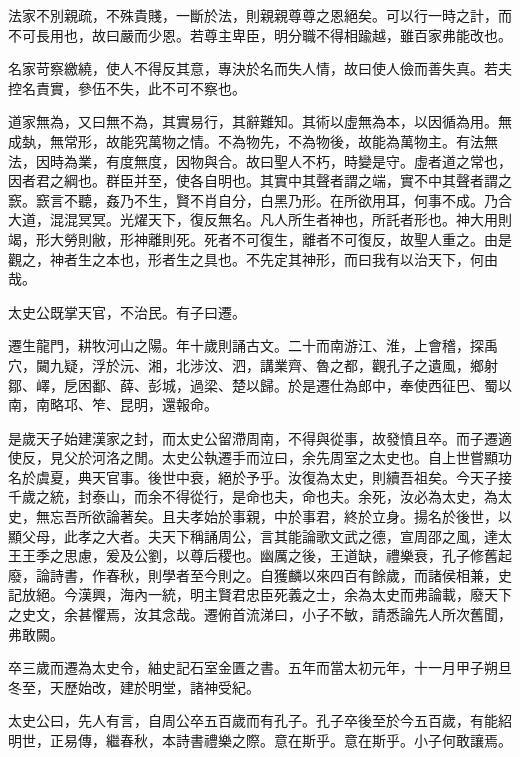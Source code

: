 法家不別親疏，不殊貴賤，一斷於法，則親親尊尊之恩絕矣。可以行一時之計，而不可長用也，故曰嚴而少恩。若尊主卑臣，明分職不得相踰越，雖百家弗能改也。

名家苛察繳繞，使人不得反其意，專決於名而失人情，故曰使人儉而善失真。若夫控名責實，參伍不失，此不可不察也。

道家無為，又曰無不為，其實易行，其辭難知。其術以虛無為本，以因循為用。無成埶，無常形，故能究萬物之情。不為物先，不為物後，故能為萬物主。有法無法，因時為業，有度無度，因物與合。故曰聖人不朽，時變是守。虛者道之常也，因者君之綱也。群臣并至，使各自明也。其實中其聲者謂之端，實不中其聲者謂之窾。窾言不聽，姦乃不生，賢不肖自分，白黑乃形。在所欲用耳，何事不成。乃合大道，混混冥冥。光燿天下，復反無名。凡人所生者神也，所託者形也。神大用則竭，形大勞則敝，形神離則死。死者不可復生，離者不可復反，故聖人重之。由是觀之，神者生之本也，形者生之具也。不先定其神形，而曰我有以治天下，何由哉。

太史公既掌天官，不治民。有子曰遷。

遷生龍門，耕牧河山之陽。年十歲則誦古文。二十而南游江、淮，上會稽，探禹穴，闚九疑，浮於沅、湘，北涉汶、泗，講業齊、魯之都，觀孔子之遺風，鄉射鄒、嶧，戹困鄱、薛、彭城，過梁、楚以歸。於是遷仕為郎中，奉使西征巴、蜀以南，南略邛、笮、昆明，還報命。

是歲天子始建漢家之封，而太史公留滯周南，不得與從事，故發憤且卒。而子遷適使反，見父於河洛之閒。太史公執遷手而泣曰，余先周室之太史也。自上世嘗顯功名於虞夏，典天官事。後世中衰，絕於予乎。汝復為太史，則續吾祖矣。今天子接千歲之統，封泰山，而余不得從行，是命也夫，命也夫。余死，汝必為太史，為太史，無忘吾所欲論著矣。且夫孝始於事親，中於事君，終於立身。揚名於後世，以顯父母，此孝之大者。夫天下稱誦周公，言其能論歌文武之德，宣周邵之風，達太王王季之思慮，爰及公劉，以尊后稷也。幽厲之後，王道缺，禮樂衰，孔子修舊起廢，論詩書，作春秋，則學者至今則之。自獲麟以來四百有餘歲，而諸侯相兼，史記放絕。今漢興，海內一統，明主賢君忠臣死義之士，余為太史而弗論載，廢天下之史文，余甚懼焉，汝其念哉。遷俯首流涕曰，小子不敏，請悉論先人所次舊聞，弗敢闕。

卒三歲而遷為太史令，紬史記石室金匱之書。五年而當太初元年，十一月甲子朔旦冬至，天歷始改，建於明堂，諸神受紀。

太史公曰，先人有言，自周公卒五百歲而有孔子。孔子卒後至於今五百歲，有能紹明世，正易傳，繼春秋，本詩書禮樂之際。意在斯乎。意在斯乎。小子何敢讓焉。

